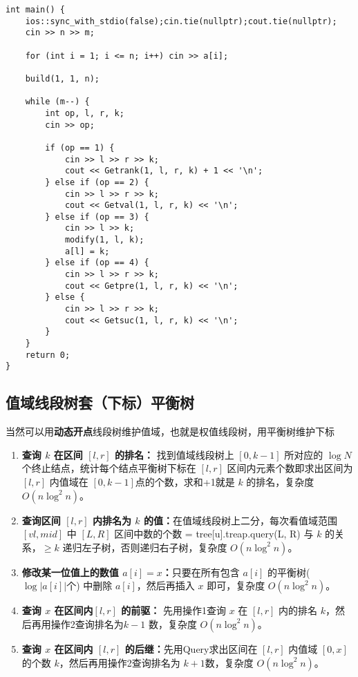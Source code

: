 \begin{verbatim}
int main() {
    ios::sync_with_stdio(false);cin.tie(nullptr);cout.tie(nullptr);
    cin >> n >> m;

    for (int i = 1; i <= n; i++) cin >> a[i];

    build(1, 1, n);

    while (m--) {
        int op, l, r, k;
        cin >> op;
    
        if (op == 1) {
            cin >> l >> r >> k;
            cout << Getrank(1, l, r, k) + 1 << '\n';
        } else if (op == 2) {
            cin >> l >> r >> k;
            cout << Getval(1, l, r, k) << '\n';
        } else if (op == 3) {
            cin >> l >> k;
            modify(1, l, k);
            a[l] = k;
        } else if (op == 4) {
            cin >> l >> r >> k;
            cout << Getpre(1, l, r, k) << '\n';
        } else {
            cin >> l >> r >> k;
            cout << Getsuc(1, l, r, k) << '\n';
        }
    }
    return 0;
}
\end{verbatim}


\subsection{值域线段树套（下标）平衡树}

\par \noindent 当然可以用\textbf{动态开点}线段树维护值域，也就是权值线段树，用平衡树维护下标
~\\
\begin{enumerate}
\item \textbf{查询 $k$ 在区间 $[l,r]$ 的排名：} 找到值域线段树上 $[0,k-1]$ 所对应的 $\log N$个终止结点，统计每个结点平衡树下标在 $[l,r]$ 区间内元素个数即求出区间为 $[l,r]$ 内值域在 $[0,k-1]$点的个数，求和+1就是 $k$ 的排名，复杂度 $O(n\log^2n)$。

\item \textbf{查询区间 $[l,r]$ 内排名为 $k$ 的值：}在值域线段树上二分，每次看值域范围 $[vl,mid]$ 中 $[L,R]$ 区间中数的个数 = tree[u].treap.query(L, R) 与 $k$ 的关系，$\ge k$ 递归左子树，否则递归右子树，复杂度 $O(n\log^2 n)$。
\item \textbf{修改某一位值上的数值 $a[i]=x$：}只要在所有包含 $a[i]$ 的平衡树($\log {|a[i]|}$个) 中删除 $a[i]$，然后再插入 $x$ 即可，复杂度 $O(n\log^2n)$。
\item \textbf{查询 $x$ 在区间内$[l,r]$ 的前驱：} 先用操作1查询 $x$ 在 $[l,r]$ 内的排名 $k$，然后再用操作2查询排名为$k-1$ 数，复杂度 $O(n\log^2n)$。
\item \textbf{查询 $x$ 在区间内 $[l,r]$ 的后继：}先用Query求出区间在 $[l,r]$ 内值域 $[0,x]$ 的个数 $k$，然后再用操作2查询排名为 $k+1$数，复杂度 $O(n\log^2n)$。
\end{enumerate}

